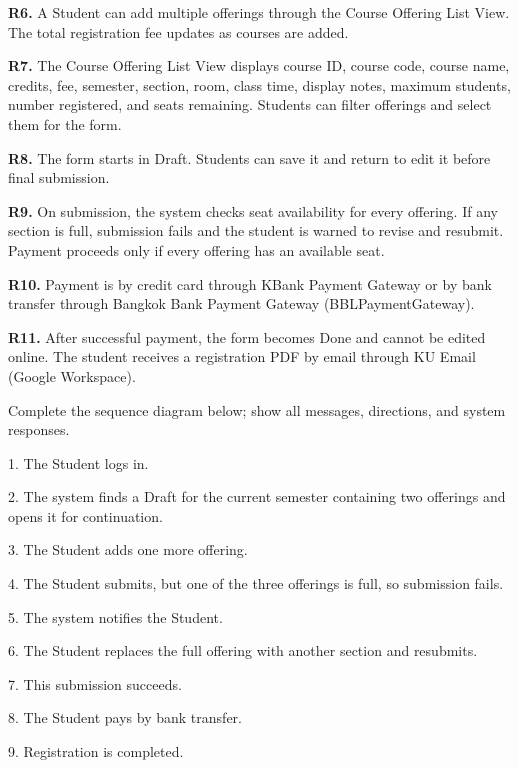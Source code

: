 \textbf{R6.} A Student can add multiple offerings through the Course Offering List View. The total registration fee updates as courses are added.\par\smallskip
\textbf{R7.} The Course Offering List View displays course ID, course code, course name, credits, fee, semester, section, room, class time, display notes, maximum students, number registered, and seats remaining. Students can filter offerings and select them for the form.\par\smallskip
\textbf{R8.} The form starts in Draft. Students can save it and return to edit it before final submission.\par\smallskip
\textbf{R9.} On submission, the system checks seat availability for every offering. If any section is full, submission fails and the student is warned to revise and resubmit. Payment proceeds only if every offering has an available seat.\par\smallskip
\textbf{R10.} Payment is by credit card through KBank Payment Gateway or by bank transfer through Bangkok Bank Payment Gateway (BBLPaymentGateway).\par\smallskip
\textbf{R11.} After successful payment, the form becomes Done and cannot be edited online. The student receives a registration PDF by email through KU Email (Google Workspace).\par\smallskip
\newpage
{}
Complete the sequence diagram below; show all messages, directions, and system responses.\par
\begingroup\setlength{\parskip}{0pt}
1. The Student logs in.\par
2. The system finds a Draft for the current semester containing two offerings and opens it for continuation.\par
3. The Student adds one more offering.\par
4. The Student submits, but one of the three offerings is full, so submission fails.\par
5. The system notifies the Student.\par
6. The Student replaces the full offering with another section and resubmits.\par
7. This submission succeeds.\par
8. The Student pays by bank transfer.\par
9. Registration is completed.\par
\endgroup
\begin{center}\end{center}
